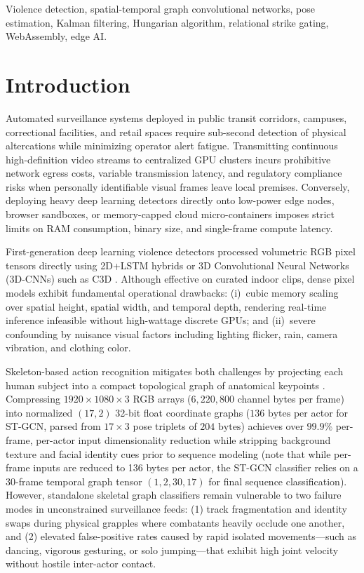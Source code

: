 \documentclass[conference]{IEEEtran}
\begin{document}
\begin{abstract}
\end{abstract}

\begin{IEEEkeywords}
Violence detection, spatial-temporal graph convolutional networks, pose estimation, Kalman filtering, Hungarian algorithm, relational strike gating, WebAssembly, edge AI.
\end{IEEEkeywords}

\section{Introduction}
Automated surveillance systems deployed in public transit corridors, campuses, correctional facilities, and retail spaces require sub-second detection of physical altercations while minimizing operator alert fatigue. Transmitting continuous high-definition video streams to centralized GPU clusters incurs prohibitive network egress costs, variable transmission latency, and regulatory compliance risks when personally identifiable visual frames leave local premises. Conversely, deploying heavy deep learning detectors directly onto low-power edge nodes, browser sandboxes, or memory-capped cloud micro-containers imposes strict limits on RAM consumption, binary size, and single-frame compute latency.

First-generation deep learning violence detectors processed volumetric RGB pixel tensors directly using 2D+LSTM hybrids or 3D Convolutional Neural Networks (3D-CNNs) such as C3D \cite{b1}. Although effective on curated indoor clips, dense pixel models exhibit fundamental operational drawbacks: (i)~cubic memory scaling over spatial height, spatial width, and temporal depth, rendering real-time inference infeasible without high-wattage discrete GPUs; and (ii)~severe confounding by nuisance visual factors including lighting flicker, rain, camera vibration, and clothing color.

Skeleton-based action recognition mitigates both challenges by projecting each human subject into a compact topological graph of anatomical keypoints \cite{b2}. Compressing $1920 \times 1080 \times 3$ RGB arrays ($6{,}220{,}800$ channel bytes per frame) into normalized $(17, 2)$ 32-bit float coordinate graphs ($136\text{ bytes}$ per actor for ST-GCN, parsed from $17 \times 3$ pose triplets of $204\text{ bytes}$) achieves over $99.9\%$ per-frame, per-actor input dimensionality reduction while stripping background texture and facial identity cues prior to sequence modeling (note that while per-frame inputs are reduced to 136 bytes per actor, the ST-GCN classifier relies on a 30-frame temporal graph tensor $(1, 2, 30, 17)$ for final sequence classification). However, standalone skeletal graph classifiers remain vulnerable to two failure modes in unconstrained surveillance feeds: (1) track fragmentation and identity swaps during physical grapples where combatants heavily occlude one another, and (2) elevated false-positive rates caused by rapid isolated movements—such as dancing, vigorous gesturing, or solo jumping—that exhibit high joint velocity without hostile inter-actor contact.
\end{document}
